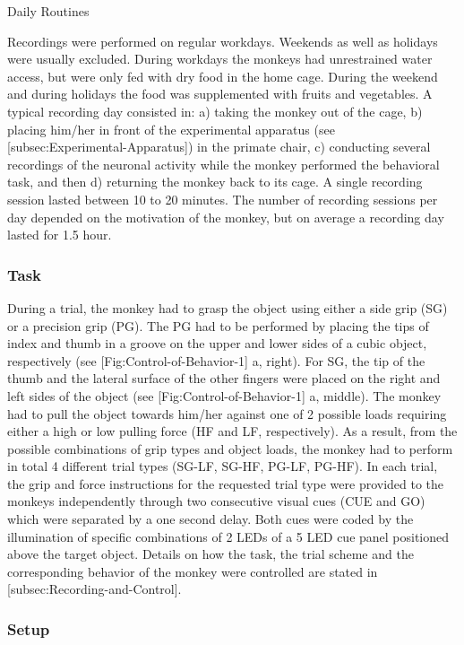 {Daily Routines

Recordings were performed on regular workdays. Weekends as well as holidays were usually excluded. During workdays the monkeys had unrestrained water access, but were only fed with dry food in the home cage. During the weekend and during holidays the food was supplemented with fruits and vegetables. A typical recording day consisted in: a) taking the monkey out of the cage, b) placing him/her in front of the experimental apparatus (see [subsec:Experimental-Apparatus]) in the primate chair, c) conducting several recordings of the neuronal activity while the monkey performed the behavioral task, and then d) returning the monkey back to its cage. A single recording session lasted between 10 to 20 minutes. The number of recording sessions per day depended on the motivation of the monkey, but on average a recording day lasted for 1.5 hour.

\subsubsection{Task}

During a trial, the monkey had to grasp the object using either a side grip (SG) or a precision grip (PG). The PG had to be performed by placing the tips of index and thumb in a groove on the upper and lower sides of a cubic object, respectively (see [Fig:Control-of-Behavior-1] a, right). For SG, the tip of the thumb and the lateral surface of the other fingers were placed on the right and left sides of the object (see [Fig:Control-of-Behavior-1] a, middle). The monkey had to pull the object towards him/her against one of 2 possible loads requiring either a high or low pulling force (HF and LF, respectively). As a result, from the possible combinations of grip types and object loads, the monkey had to perform in total 4 different trial types (SG-LF, SG-HF, PG-LF, PG-HF). In each trial, the grip and force instructions for the requested trial type were provided to the monkeys independently through two consecutive visual cues (CUE and GO) which were separated by a one second delay. Both cues were coded by the illumination of specific combinations of 2 LEDs of a 5 LED cue panel positioned above the target object. Details on how the task, the trial scheme and the corresponding behavior of the monkey were controlled are stated in [subsec:Recording-and-Control].

\subsubsection{Setup}



}
